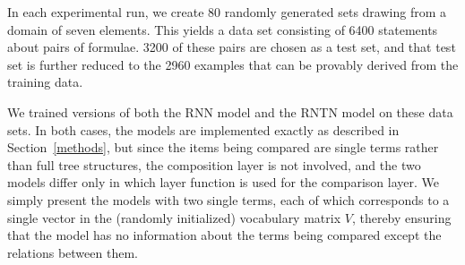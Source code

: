 In each experimental run, we create 80 randomly generated sets drawing from
a domain of seven elements. This yields a data set consisting of
6400 statements about pairs of formulae. 3200 of these pairs are
chosen as a test set, and that test set is further reduced to the 2960
examples that can be provably derived from the training data.

We trained versions of both the RNN model and the RNTN model on these
data sets. In both cases, the models are implemented exactly as
described in Section~\ref{methods}, but since the items being compared
are single terms rather than full tree structures, the composition
layer is not involved, and the two models differ only in which
layer function is used for the comparison layer. We simply present
the models with two single terms, each of which corresponds to a
single vector in the (randomly initialized) vocabulary matrix $V$,
thereby ensuring that the model has no information about the terms
being compared except the relations between them.



